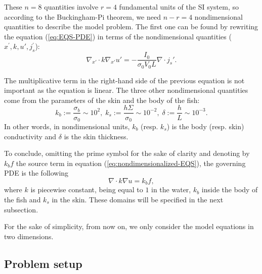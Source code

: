 \documentclass[final]{siamltex}
\numberwithin{equation}{section}
\numberwithin{figure}{section}
\numberwithin{table}{section}
\begin{document}
These $n=8$ quantities involve $r=4$ fundamental units of the SI
system, so according to the Buckingham-Pi theorem, we need $n-r=4$
nondimensional quantities to describe the model problem. The first
one can be found by rewriting the equation (\ref{eq:EQS-PDE}) in
terms of the nondimensional quantities ($x^\prime, k, u',
j_{s}^\prime$):
\begin{equation}
\nabla_{x'}\cdot
k\nabla_{x'}u'=-\frac{I_{0}}{\sigma_{0}V_{0}L}\nabla\cdot
{j_{s}'}.\label{eq:nondimensionalized-EQS}
\end{equation}

The multiplicative term in the right-hand side of the previous
equation is not important as the equation is linear. The three
other nondimensional quantities come from the parameters of the
skin and the body of the fish:
\[
k_{b}:=\frac{\sigma_{b}}{\sigma_{0}}\sim10^{2},\; k_{s}:=\frac{h\Sigma}{\sigma_{0}}\sim10^{-2},\;\delta:=\frac{h}{L}\sim10^{-3}.
\]
 In other words, in nondimensional units, $k_{b}$ (resp. $k_{s}$)
is the body (resp. skin) conductivity and $\delta$ is the skin thickness.

To conclude, omitting the prime symbol for the sake of clarity and
denoting by $k_b f$ the source term in equation
(\ref{eq:nondimensionalized-EQS}), the governing PDE is the
following
\begin{equation}
\nabla\cdot k\nabla u= k_b f,\label{eq:EQS-final}
\end{equation}
 where $k$ is piecewise constant, being equal to $1$ in the water,
$k_{b}$ inside the body of the fish and $k_{s}$ in the skin. These
domains will be specified in the next subsection.

For the sake of simplicity, from now on, we only consider  the
model equations in two dimensions.

\subsection{Problem setup} \label{problemsetup}
\end{document}
